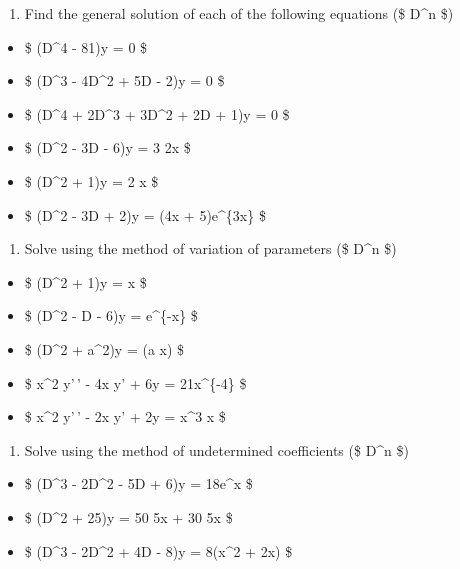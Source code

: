 \documentclass{article}
\begin{document}
    \begin{enumerate}
\def\labelenumi{\arabic{enumi}.}
\setcounter{enumi}{3}
\tightlist
\item
  Find the general solution of each of the following equations (\$
  D\^{}n \equiv {} \$)
\end{enumerate}

\begin{itemize}
\tightlist
\item
  \$ (D\^{}4 - 81)y = 0 \$
\item
  \$ (D\^{}3 - 4D\^{}2 + 5D - 2)y = 0 \$
\item
  \$ (D\^{}4 + 2D\^{}3 + 3D\^{}2 + 2D + 1)y = 0 \$
\item
  \$ (D\^{}2 - 3D - 6)y = 3 \sin 2x \$
\item
  \$ (D\^{}2 + 1)y = 2 \cos x \$
\item
  \$ (D\^{}2 - 3D + 2)y = (4x + 5)e\^{}\{3x\} \$
\end{itemize}

    \begin{enumerate}
\def\labelenumi{\arabic{enumi}.}
\setcounter{enumi}{4}
\tightlist
\item
  Solve using the method of variation of parameters (\$ D\^{}n
  \equiv {} \$)
\end{enumerate}

\begin{itemize}
\tightlist
\item
  \$ (D\^{}2 + 1)y = \csc x \$
\item
  \$ (D\^{}2 - D - 6)y = e\^{}\{-x\} \$
\item
  \$ (D\^{}2 + a\^{}2)y = \tan (a x) \$
\item
  \$ x\^{}2 y'\,' - 4x y' + 6y = 21x\^{}\{-4\} \$
\item
  \$ x\^{}2 y'\,' - 2x y' + 2y = x\^{}3 \cos x \$
\end{itemize}

    \begin{enumerate}
\def\labelenumi{\arabic{enumi}.}
\setcounter{enumi}{5}
\tightlist
\item
  Solve using the method of undetermined coefficients (\$ D\^{}n
  \equiv {} \$)
\end{enumerate}

\begin{itemize}
\tightlist
\item
  \$ (D\^{}3 - 2D\^{}2 - 5D + 6)y = 18e\^{}x \$
\item
  \$ (D\^{}2 + 25)y = 50 \cos 5x + 30 \sin 5x \$
\item
  \$ (D\^{}3 - 2D\^{}2 + 4D - 8)y = 8(x\^{}2 + \cos 2x) \$
\end{itemize}
\end{document}
